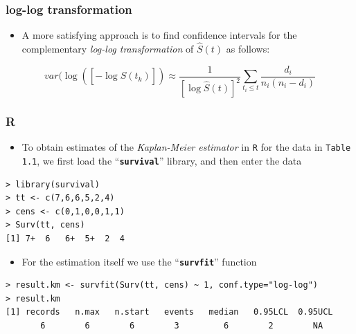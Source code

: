 \documentclass{beamer}
\newcommand{\empr}[1]{{\emph{\color{red}#1}}}
\newcommand{\pkg}[1]{{\textbf{\texttt{#1}}}}
\begin{document}
\pagebreak
\begin{frame}
\frametitle{log-log transformation}
\begin{itemize}
\item A more satisfying approach is to find confidence intervals for the complementary \empr{log-log transformation} of $\hat{S}(t)$  as follows:
\end{itemize}
\begin{equation}
var(\log([-\log\hat{S}(t_k)])\approx \frac{1}{[\log\hat{S}(t)]^{2}}\sum\limits_{t_i\le t}^{} \frac{d_i}{n_i(n_i -d_i)}
\end{equation}
\end{frame}

\pagebreak
\begin{frame}[fragile]
\frametitle{R}
\begin{itemize}
\item To obtain estimates of the \empr{Kaplan-Meier estimator} in \texttt{R} for the data in \texttt{Table 1.1}, we first load the  ``\pkg{survival}'' library, and then enter the data
\end{itemize}

\begin{Verbatim}
> library(survival)
> tt <- c(7,6,6,5,2,4)
> cens <- c(0,1,0,0,1,1)
> Surv(tt, cens)
[1] 7+  6   6+  5+  2  4
\end{Verbatim}

\begin{itemize}
\item For the estimation itself we use the ``\pkg{survfit}'' function
\end{itemize}

\begin{Verbatim}
> result.km <- survfit(Surv(tt, cens) ~ 1, conf.type="log-log")
> result.km
[1] records   n.max   n.start   events   median   0.95LCL  0.95UCL 
       6        6        6        3         6        2        NA
\end{Verbatim}
\end{frame}
\end{document}
